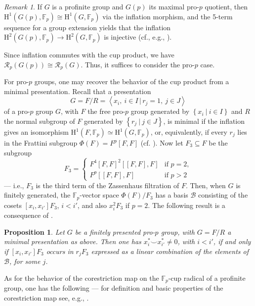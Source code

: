 \documentclass{amsart}
\newtheorem{prop}[thm]{Proposition}
\theoremstyle{definition}
\theoremstyle{remark}
\newtheorem{rem}[thm]{Remark}
\newcommand{\FF}{\mathbb{F}}
\newcommand{\calR}{\mathcal{R}}
\newcommand{\rmH}{\mathrm H}%
\newcommand{\set}[2]{\left\lbrace{#1}\ \big\vert\ {#2}\right\rbrace}
\newcommand{\pres}[2]{\left\langle{#1}\, \big\vert\, {#2}\right\rangle}
\newcommand{\F}{\FF}
\begin{document}
\begin{rem}

\label{rem: radical reduction to pro-p case}
    If $G$ is a profinite group and $G(p)$ its maximal pro-$p$ quotient, then $\rmH^1(G(p),\FF_p)\cong \rmH^1(G,\FF_p)$ via the inflation morphism, and the 5-term sequence for a group extension yields that the inflation $\rmH^2(G(p),\FF_p)\to \rmH^2(G,\FF_p)$ is injective (cf., e.g., \cite[Prop.~1.6.7]{NSW2008}). 

\noindent    Since inflation commutes with the cup product, we have $\calR_p(G(p))\cong \calR_p(G)$. Thus, it suffices to consider the pro-$p$ case. 
\end{rem}

For pro-$p$ groups, one may recover the behavior of the cup product from a minimal presentation.
Recall that a presentation 
$$G=F/R=\pres{x_i,\:i\in I}{r_j=1,\:j\in J}$$
of a pro-$p$ group $G$, with $F$ the free pro-$p$ group generated by $\set{x_i}{ i\in I}$ and $R$ the normal subgroup of $F$ generated by $\set{r_j}{ j\in J}$, is minimal if the inflation gives an isomorphism $\rmH^1(F,\F_p)\simeq\rmH^1(G,\F_p)$, or, equivalently, if every $r_j$ lies in the Frattini subgroup $\Phi(F)=F^p[F,F]$ (cf. \cite{NSW2008}). Now let $F_3\subseteq F$ be the subgroup
\[F_3=\begin{cases} F^4[F,F]^2[[F,F],F] & \text{if }p=2,\\ 
F^p[[F,F],F] & \text{if } p>2
\end{cases}\]
--- i.e., $F_3$ is the third term of the Zassenhaus filtration of $F$. Then, when $G$ is finitely generated, the $\F_p$-vector space $\Phi(F)/F_3$ has a basis $\mathcal{B}$ consisting of the cosets $[x_i,x_{i'}]F_3$, $i<i'$, and also $x_i^2F_3$ if $p=2$. 
The following result is a consequence of \cite[Prop. 1.3.2]{Vogel2004}.
\begin{prop}\label{prop:cup product and shape of relations}
Let $G$ be a finitely presented pro-$p$ group, with $G=F/R$ a minimal presentation as above.
Then one has $x_i^\ast\smallsmile x_{i'}^\ast\neq 0$, with $i<i'$, if and only if $[x_i,x_{i'}]F_3$ occurs in $r_jF_3$ expressed as a linear combination of the elements of $\mathcal{B}$, for some $j$.
\end{prop}


As for the behavior of the corestriction map on the $\F_p$-cup radical of a profinite group, one has the following --- for definition and basic properties of the corestriction map see, e.g., \cite[Ch.~I, \S~4]{NSW2008}.
\end{document}
